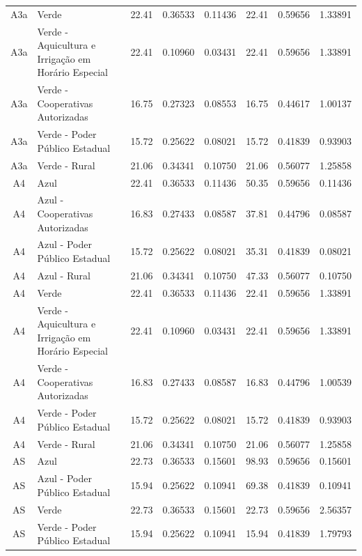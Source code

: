 \documentclass[grad,numbers]{coppe}
\begin{document}
\begin{longtable}[t]{c>{\centering\arraybackslash}p{8em}cccccc}
  A3a & Verde & 22.41 & 0.36533 & 0.11436 & 22.41 & 0.59656 & 1.33891\\
  A3a & Verde - Aquicultura e Irrigação em Horário Especial & 22.41 & 0.10960 & 0.03431 & 22.41 & 0.59656 & 1.33891\\
  \addlinespace
  A3a & Verde - Cooperativas Autorizadas & 16.75 & 0.27323 & 0.08553 & 16.75 & 0.44617 & 1.00137\\
  A3a & Verde - Poder Público Estadual & 15.72 & 0.25622 & 0.08021 & 15.72 & 0.41839 & 0.93903\\
  A3a & Verde - Rural & 21.06 & 0.34341 & 0.10750 & 21.06 & 0.56077 & 1.25858\\
  A4 & Azul & 22.41 & 0.36533 & 0.11436 & 50.35 & 0.59656 & 0.11436\\
  A4 & Azul - Cooperativas Autorizadas & 16.83 & 0.27433 & 0.08587 & 37.81 & 0.44796 & 0.08587\\
  \addlinespace
  A4 & Azul - Poder Público Estadual & 15.72 & 0.25622 & 0.08021 & 35.31 & 0.41839 & 0.08021\\
  A4 & Azul - Rural & 21.06 & 0.34341 & 0.10750 & 47.33 & 0.56077 & 0.10750\\
  A4 & Verde & 22.41 & 0.36533 & 0.11436 & 22.41 & 0.59656 & 1.33891\\
  A4 & Verde - Aquicultura e Irrigação em Horário Especial & 22.41 & 0.10960 & 0.03431 & 22.41 & 0.59656 & 1.33891\\
  A4 & Verde - Cooperativas Autorizadas & 16.83 & 0.27433 & 0.08587 & 16.83 & 0.44796 & 1.00539\\
  \addlinespace
  A4 & Verde - Poder Público Estadual & 15.72 & 0.25622 & 0.08021 & 15.72 & 0.41839 & 0.93903\\
  A4 & Verde - Rural & 21.06 & 0.34341 & 0.10750 & 21.06 & 0.56077 & 1.25858\\
  AS & Azul & 22.73 & 0.36533 & 0.15601 & 98.93 & 0.59656 & 0.15601\\
  AS & Azul - Poder Público Estadual & 15.94 & 0.25622 & 0.10941 & 69.38 & 0.41839 & 0.10941\\
  AS & Verde & 22.73 & 0.36533 & 0.15601 & 22.73 & 0.59656 & 2.56357\\
  \addlinespace
  AS & Verde - Poder Público Estadual & 15.94 & 0.25622 & 0.10941 & 15.94 & 0.41839 & 1.79793\\*
  \end{longtable}
  \endgroup{}
\end{document}
